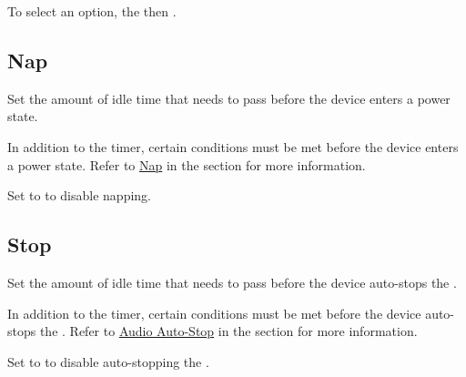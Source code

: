 To select an option,  the  then .


\subsection{Nap} 

Set the amount of idle time that needs to pass before the device enters a
 power state.

\par\medskip

In addition to the timer, certain conditions must be met before the device
enters a  power state.  Refer to \hyperref[Power - Nap]{Nap} in the
\hyperref[Power]{} section for more information.

\par\medskip

Set to  to disable napping.

\subsection{Stop} 

Set the amount of idle time that needs to pass before the device auto-stops the
.

\par\medskip

In addition to the timer, certain conditions must be met before the device
auto-stops the .  Refer to \hyperref[Power - Stop]{Audio Auto-Stop} in the
\hyperref[Power]{} section for more information.

\par\medskip

Set to  to disable auto-stopping the .

